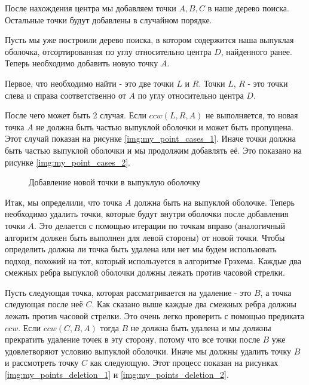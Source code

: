 После нахождения центра мы добавляем точки $A, B, C$ в наше дерево поиска. Остальные точки будут добавлены в случайном порядке.

Пусть мы уже построили дерево поиска, в котором содержится наша выпуклая оболочка, отсортированная по углу относительно центра $D$, найденного ранее. Теперь необходимо добавить новую точку $A$.

Первое, что необходимо найти - это две точки $L$ и $R$. Точки $L$, $R$ - это точки слева и справа соответственно от $A$ по углу относительно центра $D$.


После чего может быть 2 случая. Если $ccw(L, R, A)$ не выполняется, то новая точка $A$ не должна быть частью выпуклой оболочки и может быть пропущена. Этот случай показан на рисунке \ref{img:my_point_cases_1}. Иначе точки должна быть частью выпуклой оболочки и мы продолжим добавлять её. Это показано на рисунке \ref{img:my_point_cases_2}.

\begin{figure}[H]
	{\centering
		\hfill
		\subbottom[\label{img:my_point_cases_1}]{%
			}
		\hfill
		\subbottom[\label{img:my_point_cases_2}]{%
			}
		\hfill
	}
	\caption{Добавление новой точки в выпуклую оболочку}
	\label{img:my_point_cases}
\end{figure}

Итак, мы определили, что точка $A$ должна быть на выпуклой оболочке. Теперь необходимо удалить точки, которые будут внутри оболочки после добавления точки $A$. Это делается с помощью итерации по точкам вправо (аналогичный алгоритм должен быть выполнен для левой стороны) от новой точки. Чтобы определить должна ли точка быть удалена или нет мы будем использовать подход, похожий на тот, который используется в алгоритме Грэхема. Каждые два смежных ребра выпуклой оболочки должны лежать против часовой стрелки.

Пусть следующая точка, которая рассматривается на удаление - это $B$, а точка следующая после неё $C$. Как сказано выше каждые два смежных ребра должны лежать против часовой стрелки. Это очень легко проверить с помощью предиката $ccw$. Если $ccw(C, B, A)$ тогда $B$ не должна быть удалена и мы должны прекратить удаление точек в эту сторону, потому что все точки после $B$ уже удовлетворяют условию выпуклой оболочки. Иначе мы должны удалить точку $B$ и рассмотреть точку $C$ как следующую. Этот процесс показан на рисунках \ref{img:my_points_deletion_1} и \ref{img:my_points_deletion_2}.

